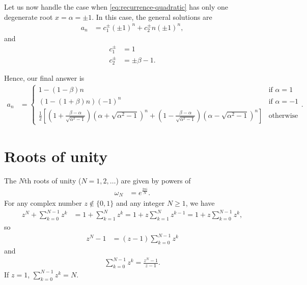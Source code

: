 Let us now handle the case when \cref{eq:recurrence-quadratic} has only one degenerate root $x = \alpha = \pm 1$.
In this case, the general solutions are
\begin{align}
	a_n
	&= c_1^\pm (\pm 1)^n + c_2^\pm n (\pm 1)^n,
\end{align}
and
\begin{subequations}
\begin{align}
	c_1^\pm
	&= 1 \\
	c_2^\pm
	&= \pm \beta - 1.
\end{align}
\end{subequations}

Hence, our final answer is
\begin{align}
	a_n
	&= \begin{cases}
			1 - (1 - \beta) n & \text{if } \alpha = 1 \\
			(1 - (1 + \beta) n) (-1)^n & \text{if } \alpha = -1 \\
			\frac{1}{2} \left[
					\left( 1 + \frac{\beta - \alpha}{\sqrt{\alpha^2 - 1}} \right) \left( \alpha + \sqrt{\alpha^2 - 1} \right)^n
					+ \left( 1 - \frac{\beta - \alpha}{\sqrt{\alpha^2 - 1}} \right) \left( \alpha - \sqrt{\alpha^2 - 1} \right)^n
			\right] & \text{otherwise}
		\end{cases}.
			\label{eq:recurrence-relation}
\end{align}


\section{Roots of unity}

The $N$th roots of unity ($N = 1, 2, \ldots$) are given by powers of
\begin{align}
	\omega_N
	&= e^{\frac{2 \pi i}{N}}.
\end{align}
For any complex number $z \not\in \{ 0, 1 \}$ and any integer $N \ge 1$, we have
\begin{align}
	z^N + \sum_{k=0}^{N-1} z^k
	&= 1 + \sum_{k=1}^{N} z^k
	= 1 + z \sum_{k=1}^{N} z^{k-1}
	= 1 + z \sum_{k=0}^{N-1} z^k,
\end{align}
so
\begin{align}
	z^N - 1
	&= (z - 1) \sum_{k=0}^{N-1} z^k
\end{align}
and
\begin{align}
	\sum_{k=0}^{N-1} z^k
	= \frac{z^N - 1}{z - 1}.
\end{align}
If $z = 1$, $\sum_{k=0}^{N-1} z^k = N$.

